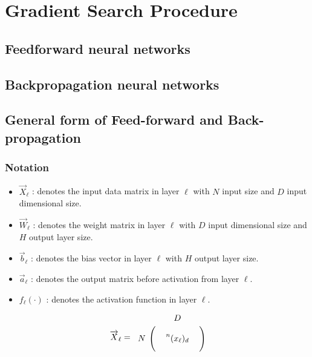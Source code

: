 \documentclass[12pt,a4paper]{article}%
\theoremstyle{definition}
\theoremstyle{plain}
\numberwithin{equation}{section}
\begin{document}
\setcounter{section}{0}
\section{Gradient Search Procedure}

\subsection{Feedforward neural networks}

\subsection{Backpropagation neural networks}

\subsection{General form of Feed-forward and Back-propagation}

\subsubsection{Notation}
\begin{itemize}
\item $\overrightarrow{X}_{\ell}$ : denotes the input data matrix in layer $\ell$ with $N$ input size and $D$ input dimensional size.  
\item $\overrightarrow{W}_{\ell}$ : denotes the weight matrix in layer $\ell$ with $D$ input dimensional size and $H$ output layer size.
\item $\vec{b}_{\ell}$ : denotes the bias vector in layer $\ell$ with $H$ output layer size.
\item $\overrightarrow{a}_{\ell}$ : denotes the output matrix before activation from layer $\ell$.
\item $f_{\ell}(\cdot)$ : denotes the activation function in layer $\ell$. 
\end{itemize}

\begin{equation*}
\overrightarrow{X}_{\ell} =  \begin{blockarray}{cccc}
                                     & \multicolumn{3}{c}{$D$}  \\
\begin{block}{c(ccc)}
\multirow{3}{*}{$N$} &    &       &    \\
  					                 &      &  \prescript{n}{}{(x_{\ell})}_{d}     &     \\
			     	                 &      &       &       \\
\end{block}
\end{blockarray}
\end{equation*}
\end{document}
